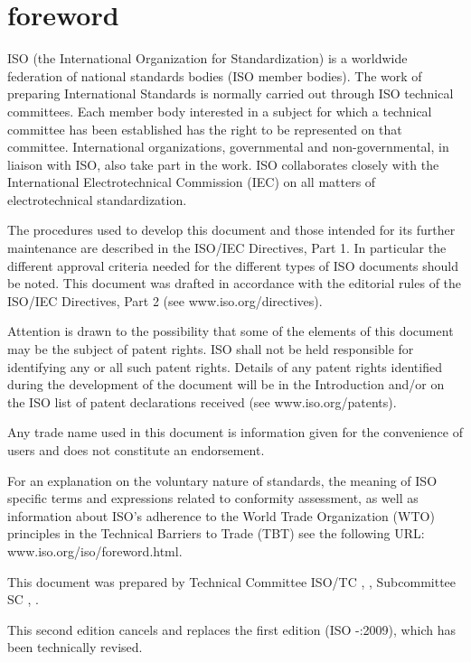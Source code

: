 \section{foreword}

ISO (the International Organization for Standardization)
is a worldwide federation of national standards bodies (ISO member bodies). The work of preparing International Standards is normally carried out through ISO technical committees. Each member body interested in a subject for which a technical committee has been established has the right to be represented on that committee. International organizations, governmental and non-governmental, in liaison with ISO, also take part in the work. ISO collaborates closely with the International Electrotechnical Commission (IEC) on all matters of electrotechnical standardization.

The procedures used to develop this document and those intended for its further maintenance are described in the ISO/IEC Directives, Part 1. In particular the different approval criteria needed for the different types of ISO documents should be noted. This document was drafted in accordance with the editorial rules of the ISO/IEC Directives, Part 2 (see www.iso.org/directives).

Attention is drawn to the possibility that some of the elements of this document may be the subject of patent rights. ISO shall not be held responsible for identifying any or all such patent rights. Details of any patent rights identified during the development of the document will be in the Introduction and/or on the ISO list of patent declarations received (see www.iso.org/patents).

Any trade name used in this document is information given for the convenience of users and does not constitute an endorsement.

For an explanation on the voluntary nature of standards, the meaning of ISO specific terms and expressions related to conformity assessment, as well as information about ISO's adherence to the World Trade Organization (WTO) principles in the Technical Barriers to Trade (TBT) see the following URL: www.iso.org/iso/foreword.html.

This document was prepared by Technical Committee ISO/TC , \textit{}, Subcommittee SC , \textit{}.

This second edition cancels and replaces the first edition (ISO -:2009), which has been technically revised.

